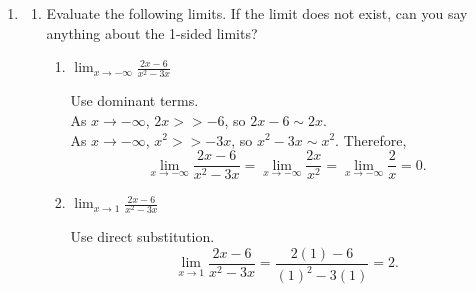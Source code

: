 \documentclass{article}
\begin{document}
\begin{enumerate}
  \begin{solution}
    When a non-piecewise function is given with its formula, we should try to use direct substitution. If
    direct substitution gives $\frac{0}{0}$, a good strategy is to try to factor and cancel. 
    If direct substitution gives
    $\frac{a}{0}$, where $a$ is a non-zero number, then we should determine whether the function is increasing
    or decreasing without bound and consider one-sided limits.

    For limits at infinity, a good strategy is to identify the dominant terms and rewrite the limit by discarding
    all but the dominant terms.

    For piecewise functions, good strategies are to identify the relevant pieces and to consider
    one-sided limits when necessary.

    Lastly, be on the lookout for limits involving the definition of the derivative.
  \end{solution}

\item 
  \begin{enumerate}
  \item Evaluate the following limits. If the limit does not exist, can you say anything about the 1-sided limits?

    \begin{enumerate}
    \item
      \begin{problem}[\stretch{0.5}]
        $\displaystyle \lim_{x \to -\infty} \frac{2x - 6}{x^2 - 3x}$
      \end{problem}

      \begin{solution}
      Use dominant terms. \\
      As $x\to-\infty$, $2x>>-6$, so $2x-6 \sim 2x$. \\
      As $x\to-\infty$, $x^2>>-3x$, so $x^2-3x\sim x^2$. Therefore, 
        \[
            \lim_{x \to -\infty} \frac{2x-6}{x^2-3x} = \lim_{x \to -\infty} \frac{2x}{x^2} 
            = \lim_{x \to -\infty} \frac{2}{x} 
            = 0.
        \]
      \end{solution}

    \item
      \begin{problem}[\stretch{0.5}]
        $\displaystyle \lim_{x \to 1} \frac{2x - 6}{x^2 - 3x}$
      \end{problem}

      \begin{solution}
      Use direct substitution.
        \[
          \lim_{x \to 1} \frac{2x - 6}{x^2 - 3x} = \frac{2(1)-6}{(1)^2-3(1)} 
          = 2.
        \]
      \end{solution}


\end{enumerate}
\end{enumerate}
\end{enumerate}
\end{document}
